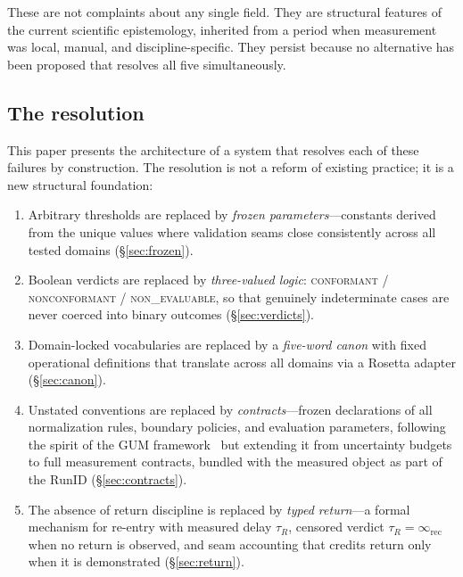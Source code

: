 \documentclass[
  aps,
  prd,
  twocolumn,
  superscriptaddress,
  nofootinbib,
  floatfix
]{revtex4-2}
\newcommand{\tR}{\tau_{\!R}}
\newcommand{\IR}{\infty_{\mathrm{rec}}}
\newcommand{\regime}[1]{\textrm{\scshape#1}}
\newcommand{\conform}{\regime{conformant}}
\newcommand{\nonconform}{\regime{nonconformant}}
\newcommand{\RunID}{\mathrm{RunID}}
\begin{document}
These are not complaints about any single field.  They are
structural features of the current scientific epistemology,
inherited from a period when measurement was local, manual, and
discipline-specific.  They persist because no alternative has been
proposed that resolves all five simultaneously.

\subsection{The resolution}

This paper presents the architecture of a system that resolves each
of these failures by construction.  The resolution is not a reform
of existing practice; it is a new structural foundation:

\begin{enumerate}[leftmargin=*,label=(\roman*)]
\item Arbitrary thresholds are replaced by \emph{frozen
  parameters}---constants derived from the unique values
  where validation seams close consistently across all
  tested domains (\S\ref{sec:frozen}).

\item Boolean verdicts are replaced by \emph{three-valued logic}:
  \conform{} / \nonconform{} / \regime{non\_evaluable}, so that
  genuinely indeterminate cases are never coerced into binary
  outcomes (\S\ref{sec:verdicts}).

\item Domain-locked vocabularies are replaced by a
  \emph{five-word canon} with fixed operational definitions
  that translate across all domains via a Rosetta adapter
  (\S\ref{sec:canon}).

\item Unstated conventions are replaced by \emph{contracts}---frozen
  declarations of all normalization rules, boundary policies, and
  evaluation parameters, following the spirit of the GUM
  framework~\cite{jcgm2008gum,nist1994uncertainty} but extending it
  from uncertainty budgets to full measurement contracts, bundled
  with the measured object as part of the $\RunID$
  (\S\ref{sec:contracts}).

\item The absence of return discipline is replaced by
  \emph{typed return}---a formal mechanism for re-entry with
  measured delay $\tR$, censored verdict $\tR = \IR$ when no
  return is observed, and seam accounting that credits return only
  when it is demonstrated (\S\ref{sec:return}).
\end{enumerate}
\end{document}
